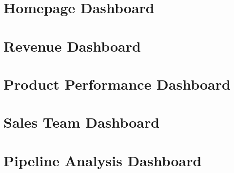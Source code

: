 \documentclass{article}
\begin{document}
\section{Homepage Dashboard}

\section{Revenue Dashboard}

\section{Product Performance Dashboard}

\section{Sales Team Dashboard}

\section{Pipeline Analysis Dashboard}
\end{document}
